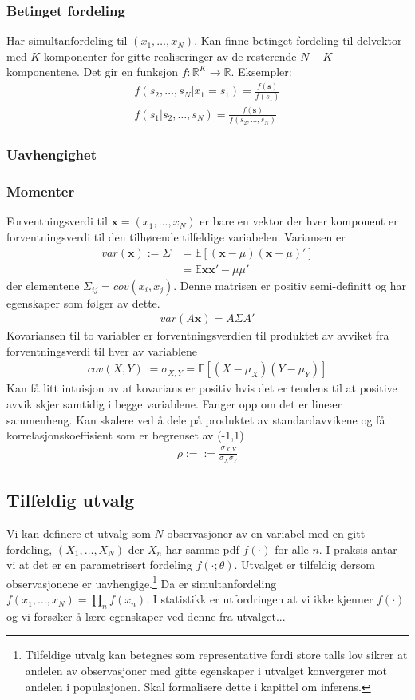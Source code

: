 \subsubsection{Betinget fordeling}
Har simultanfordeling til $(x_1,\dots,x_N)$. Kan finne betinget fordeling til delvektor med $K$ komponenter for gitte realiseringer av de resterende $N-K$ komponentene. Det gir en funksjon $f:\mathbb{R}^K\to\mathbb{R}$. Eksempler:
\begin{align}
f(s_2,\dots,s_N|x_1=s_1) = \frac{f(\mathbf{s})}{f(s_1)} \\
f(s_1|s_2,\dots,s_N) = \frac{f(\mathbf{s})}{f(s_2,\dots,s_N)}
\end{align}
\subsubsection{Uavhengighet}
\subsubsection{Momenter}
Forventningsverdi til $\mathbf{x}=(x_1,...,x_N)$ er bare en vektor der hver komponent er forventningsverdi til den tilhørende tilfeldige variabelen. Variansen er
\begin{align}
var(\mathbf{x}):= \Sigma &= \mathbb{E}[(\mathbf{x}-\mu)(\mathbf{x}-\mu)']  \\
&=\mathbb{E}\mathbf{x}\mathbf{x}'-\mu\mu'
\end{align}
der elementene $\Sigma_{ij} = cov(x_i,x_j)$. Denne matrisen er positiv semi-definitt og har egenskaper som følger av dette.
\begin{align}
var(A\mathbf{x}) = A\Sigma A'
\end{align}
Kovariansen til to variabler er forventningsverdien til produktet av avviket fra forventningsverdi til hver av variablene
\begin{align}
cov(X,Y) :=\sigma_{X,Y}= \mathbb{E}[(X-\mu_X)(Y-\mu_Y)]
\end{align}
Kan få litt intuisjon av at kovarians er positiv hvis det er tendens til at positive avvik skjer samtidig i begge variablene. Fanger opp om det er lineær sammenheng. Kan skalere ved å dele på produktet av standardavvikene og få korrelasjonskoeffisient som er begrenset av (-1,1)
\begin{align}
\rho := :=\frac{\sigma_{X,Y}}{\sigma_X \sigma_Y}
\end{align}
\subsection{Tilfeldig utvalg}
Vi kan definere et utvalg som $N$ observasjoner av en variabel med en gitt fordeling, $(X_1, \dots , X_N)$ der $X_n$ har samme pdf $f(\cdot)$ for alle $n$. I praksis antar vi at det er en parametrisert fordeling $f(\cdot;\theta)$. Utvalget er tilfeldig dersom observasjonene er uavhengige.\footnote{Tilfeldige utvalg kan betegnes som representative fordi store talls lov sikrer at andelen av observasjoner med gitte egenskaper i utvalget konvergerer mot andelen i populasjonen. Skal formalisere dette i kapittel om inferens.} Da er simultanfordeling $f(x_1,\dots, x_N) = \prod_n f(x_n)$. I statistikk er utfordringen at vi ikke kjenner $f(\cdot)$ og vi forsøker å lære egenskaper ved denne fra utvalget...
